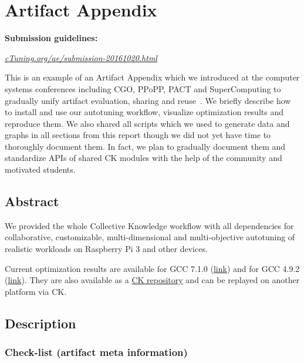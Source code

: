 \section{Artifact Appendix}
\label{artifact_appendix}

\textbf{Submission guidelines:}\begin{center}{\it \href{http://ctuning.org/ae/submission-20161020.html}{cTuning.org/ae/submission-20161020.html}}\end{center}

This is an example of an Artifact Appendix which we introduced 
at the computer systems conferences including CGO, PPoPP, PACT and SuperComputing
to gradually unify artifact evaluation, sharing and reuse~\cite{ctuning-ae1,childers2016artifact,new_pub_model,Fur2009}.
%
We briefly describe how to install and use our autotuning workflow, visualize optimization results and reproduce them.
%
We also shared all scripts which we used to generate data and
graphs in all sections from this report though we did not yet 
have time to thoroughly document them.
%
In fact, we plan to gradually document them and standardize APIs 
of shared CK modules with the help of the community and motivated students.

\subsection{Abstract}

We provided the whole Collective Knowledge workflow with all dependencies
for collaborative, customizable, multi-dimensional and multi-objective autotuning 
of realistic workloads on Raspberry Pi 3 and other devices.

Current optimization results are available for GCC 7.1.0 (\href{http://cknowledge.org/repo/web.php?wcid=8289e0cf24346aa7:79bca2b76876b5c6}{link})
and for GCC 4.9.2 (\href{http://cknowledge.org/repo/web.php?wcid=8289e0cf24346aa7:d24a4fde9f120e10}{link}).
They are also available as a \href{https://github.com/ctuning/ck-rpi-optimization-results}{CK repository} 
and can be replayed on another platform via CK.

\subsection{Description}

\subsubsection{Check-list (artifact meta information)}

